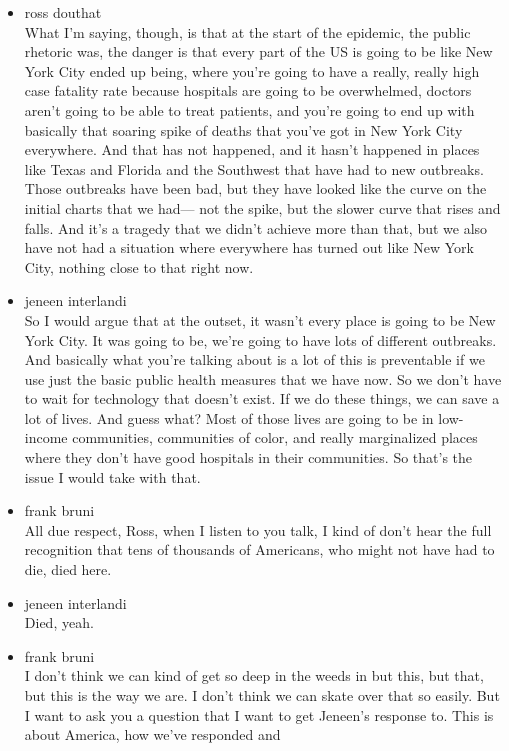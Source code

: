 \begin{itemize}
\item
  ross douthat\\
  What I'm saying, though, is that at the start of the epidemic, the
  public rhetoric was, the danger is that every part of the US is going
  to be like New York City ended up being, where you're going to have a
  really, really high case fatality rate because hospitals are going to
  be overwhelmed, doctors aren't going to be able to treat patients, and
  you're going to end up with basically that soaring spike of deaths
  that you've got in New York City everywhere. And that has not
  happened, and it hasn't happened in places like Texas and Florida and
  the Southwest that have had to new outbreaks. Those outbreaks have
  been bad, but they have looked like the curve on the initial charts
  that we had--- not the spike, but the slower curve that rises and
  falls. And it's a tragedy that we didn't achieve more than that, but
  we also have not had a situation where everywhere has turned out like
  New York City, nothing close to that right now.
\item
  jeneen interlandi\\
  So I would argue that at the outset, it wasn't every place is going to
  be New York City. It was going to be, we're going to have lots of
  different outbreaks. And basically what you're talking about is a lot
  of this is preventable if we use just the basic public health measures
  that we have now. So we don't have to wait for technology that doesn't
  exist. If we do these things, we can save a lot of lives. And guess
  what? Most of those lives are going to be in low-income communities,
  communities of color, and really marginalized places where they don't
  have good hospitals in their communities. So that's the issue I would
  take with that.
\item
  frank bruni\\
  All due respect, Ross, when I listen to you talk, I kind of don't hear
  the full recognition that tens of thousands of Americans, who might
  not have had to die, died here.
\item
  jeneen interlandi\\
  Died, yeah.
\item
  frank bruni\\
  I don't think we can kind of get so deep in the weeds in but this, but
  that, but this is the way we are. I don't think we can skate over that
  so easily. But I want to ask you a question that I want to get
  Jeneen's response to. This is about America, how we've responded and

\end{itemize}
